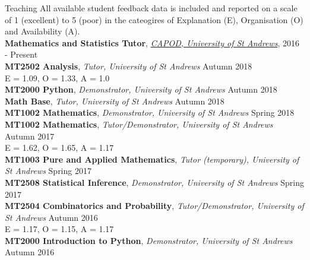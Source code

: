 \documentclass{resume} %
\begin{document}
\begin{rSection}{Teaching}
All available student feedback data is included and reported on a scale of 1 (excellent) to 5 (poor) in the cateogires of Explanation (E), Organisation (O) and Availability (A).\\

\textbf{Mathematics and Statistics Tutor}, \href{https://www.st-andrews.ac.uk/capod}{\emph{CAPOD, University of St Andrews}}, \hfill 2016 - Present\\
\textbf{MT2502 Analysis}, \emph{Tutor, University of St Andrews} \hfill Autumn 2018 \\
E = 1.09, O = 1.33, A = 1.0\\
\textbf{MT2000 Python}, \emph{Demonstrator, University of St Andrews} \hfill Autumn 2018 \\
\textbf{Math Base}, \emph{Tutor, University of St Andrews} \hfill Autumn 2018 \\
\textbf{MT1002 Mathematics}, \emph{Demonstrator, University of St Andrews} \hfill Spring 2018 \\
\textbf{MT1002 Mathematics}, \emph{Tutor/Demonstrator, University of St Andrews} \hfill Autumn 2017 \\
E = 1.62, O = 1.65, A = 1.17\\
\textbf{MT1003 Pure and Applied Mathematics}, \emph{Tutor (temporary), University of St Andrews} \hfill Spring 2017 \\
\textbf{MT2508 Statistical  Inference}, \emph{Demonstrator, University of St Andrews} \hfill Spring 2017 \\
\textbf{MT2504 Combinatorics and Probability}, \emph{Tutor/Demonstrator, University of St Andrews} \hfill Autumn 2016 \\
E = 1.17, O = 1.15, A = 1.17\\
\textbf{MT2000 Introduction to Python}, \emph{Demonstrator, University of St Andrews} \hfill Autumn 2016 \\
\end{rSection}
\end{document}
